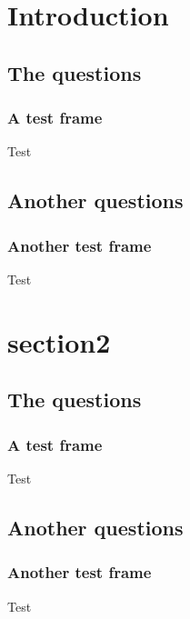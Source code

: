 \documentclass[compress,aspectratio=169]{beamer}
\begin{document}
\section{Introduction}
\subsection{The questions}
\begin{frame}\frametitle{A test frame}Test\end{frame}
\subsection{Another questions}
\begin{frame}\frametitle{Another test frame}Test
\end{frame}

\section{section2}
\subsection{The questions}
\begin{frame}\frametitle{A test frame}Test\end{frame}
\subsection{Another questions}
\begin{frame}\frametitle{Another test frame}Test
\end{frame}
\end{document}
